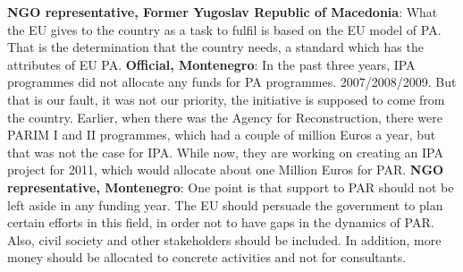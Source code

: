 \textbf{NGO representative, Former Yugoslav Republic of Macedonia}: What the EU gives to the country as a task to fulfil is based on the EU model of PA. That is the determination that the country needs, a standard which has the attributes of EU PA.
\textbf{Official, Montenegro}: In the past three years, IPA programmes did not allocate any funds for PA programmes. 2007/2008/2009. But that is our fault, it was not our priority, the initiative is supposed to come from the country. Earlier, when there was the Agency for Reconstruction, there were PARIM I and II programmes, which had a couple of million Euros a year, but that was not the case for IPA. While now, they are working on creating an IPA project for 2011, which would allocate about one Million Euros for PAR. 
\textbf{NGO representative, Montenegro}: One point is that support to PAR should not be left aside in any funding year. The EU should persuade the government to plan certain efforts in this field, in order not to have gaps in the dynamics of  PAR. Also, civil society and other stakeholders should be included. In addition, more money should be allocated to concrete activities and not for consultants.%

